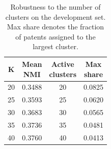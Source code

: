 \begin{table}[t]
\centering
\small
\setlength{\tabcolsep}{4pt}
\renewcommand{\arraystretch}{1.12}
\caption{Robustness to the number of clusters on the development set.
Max share denotes the fraction of patents assigned to the largest cluster.}
\label{tab:claimsem_cluster_robustness}
\begin{tabular}{@{}cccc@{}}
\toprule
$\mathbf{K}$
& \shortstack{\textbf{Mean}\\\textbf{NMI}}
& \shortstack{\textbf{Active}\\\textbf{clusters}}
& \shortstack{\textbf{Max}\\\textbf{share}} \\
\midrule
20 & 0.3488 & 20 & 0.0825 \\
25 & 0.3593 & 25 & 0.0620 \\
30 & 0.3683 & 30 & 0.0565 \\
35 & 0.3736 & 35 & 0.0481 \\
40 & 0.3760 & 40 & 0.0413 \\
\bottomrule
\end{tabular}
\end{table}
